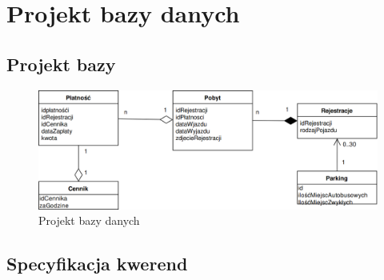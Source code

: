 \chapter{Projekt bazy danych}

\section{Projekt bazy}

\begin{figure}[H]
	\centering
	\includegraphics[width=140mm]{diagramy/bazaDanych.png}
  \caption{Projekt bazy danych}
\end{figure}



\section{Specyfikacja kwerend}
